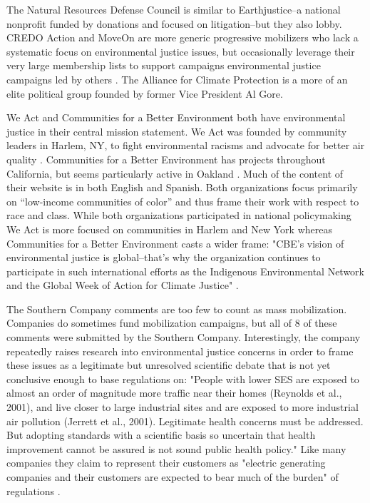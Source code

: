 The Natural Resources Defense Council is similar to Earthjustice--a national nonprofit funded by donations and focused on litigation--but they also lobby. CREDO Action and MoveOn are more generic progressive mobilizers who lack a systematic focus on environmental justice issues, but occasionally leverage their very large membership lists to support campaigns environmental justice campaigns led by others \citep{MoveOn.org2017MoveOn.OrgAction,CREDO2017CREDOTogether}. The Alliance for Climate Protection is a more of an elite political group founded by former Vice President Al Gore. 
 
 We Act and Communities for a Better Environment both have environmental justice in their central mission statement. We Act was founded by community leaders in Harlem, NY, to fight environmental racisms and advocate for better air quality \citep{WEACT2017WEChange}. Communities for a Better Environment has projects throughout California, but seems particularly active in Oakland \citep{CBECAL2017CommunitiesEnvironment}. Much of the content of their website is in both English and Spanish. Both organizations focus primarily on ``low-income communities of color'' and thus frame their work with respect to race and class. While both organizations participated in national policymaking We Act is more focused on communities in Harlem and New York whereas Communities for a Better Environment casts a wider frame: "CBE’s vision of environmental justice is global--that’s why the organization continues to participate in such international efforts as the Indigenous Environmental Network and the Global Week of Action for Climate Justice" \citep{CBECAL2017CommunitiesEnvironment}.
 
 The Southern Company comments are too few to count as mass mobilization. Companies do sometimes fund mobilization campaigns, but all of 8 of these comments were submitted by the Southern Company. Interestingly, the company repeatedly raises research into environmental justice concerns in order to frame these issues as a legitimate but unresolved scientific debate that is not yet conclusive enough to base regulations on: "People with lower SES are exposed to almost an order of magnitude more traffic near their homes (Reynolds et al., 2001), and live closer to large industrial sites and are exposed to more industrial air pollution (Jerrett et al., 2001). Legitimate health concerns must be addressed. But adopting standards with a scientific basis so uncertain that health improvement cannot be assured is not sound public health policy." Like many companies they claim to represent their customers as "electric generating companies and their customers are expected to bear much of the burden" of regulations \citep{Hobson2004CommentCompany}.
 
